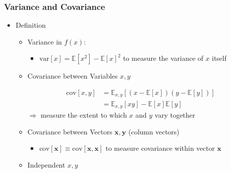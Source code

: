 \subsubsection{Variance and Covariance}
\begin{itemize}
\item Definition
	\begin{itemize}
	\item Variance in $f(x)$:
		\begin{itemize}
		\Item \begin{align*} \text{var}[f] &= \mathbb{E} \left[ \left(f(x) - \mathbb{E}[f(x)] \right)^2 \right] \\ &= \mathbb{E}[f(x)^2] - \mathbb{E}[f(x)]^2 \end{align*}
		$\Rightarrow$ measure the variability in $f(x)$ around its mean
		\item $\text{var}[x]=\mathbb{E}[x^2]-\mathbb{E}[x]^2$ to measure the variance of $x$ itself
		\end{itemize}
	\item Covariance between Variables $x,y$
		\begin{itemize}
		\Item \begin{align*} \text{cov}[x,y] &= \mathbb{E}_{x,y}[(x-\mathbb{E}[x])(y-\mathbb{E}[y])] \\ &= \mathbb{E}_{x,y}[xy] - \mathbb{E}[x]\mathbb{E}[y] \end{align*}
		$\Rightarrow$ measure the extent to which $x$ and $y$ vary together
		\end{itemize}
	\item Covariance between Vectors $\mathbf x, \mathbf y$ (column vectors)
		\begin{itemize}
		\Item \begin{align*} \text{cov}[\mathbf x, \mathbf y] &= \mathbb{E}_{\mathbf x,\mathbf y}[(\mathbf x - \mathbb{E}[\mathbf x]) \cdot (\mathbf y^T -\mathbb{E}[\mathbf y^T])] \\ &= \mathbb{E}_{\mathbf x,\mathbf y}[\mathbf{xy}^T] - \mathbb{E}[\mathbf x]\mathbb E[\mathbf y^T] \end{align*}
		$\Rightarrow$ a covariance matrix for pairwise covariance between components of $\mathbf x,\mathbf y$
		\item $\text{cov}[\mathbf x] \equiv \text{cov}[\mathbf x, \mathbf x]$ to measure covariance within vector $\mathbf x$
		\end{itemize}
	\item Independent $x,y$
		\begin{itemize}

\end{itemize}
\end{itemize}
\end{itemize}
